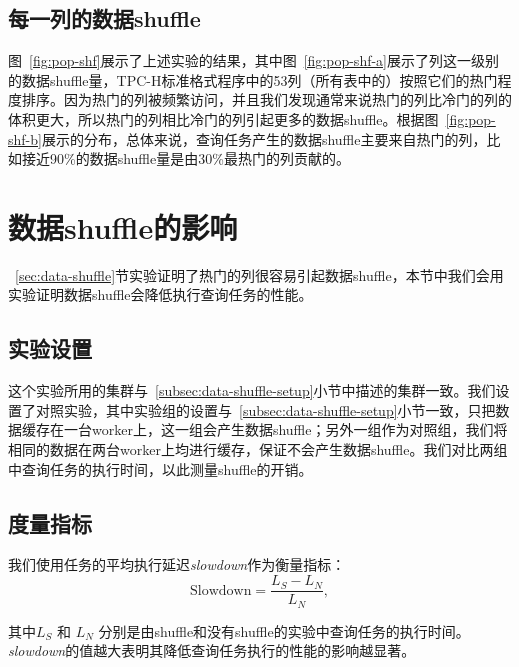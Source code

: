 \subsection{每一列的数据shuffle}

\par 图~\ref{fig:pop-shf}展示了上述实验的结果，其中图~\ref{fig:pop-shf-a}展示了列这一级别的数据shuffle量，TPC-H标准格式程序中的53列（所有表中的）按照它们的热门程度排序。因为热门的列被频繁访问，并且我们发现通常来说热门的列比冷门的列的体积更大，所以热门的列相比冷门的列引起更多的数据shuffle。根据图~\ref{fig:pop-shf-b}展示的分布，总体来说，查询任务产生的数据shuffle主要来自热门的列，比如接近90\%的数据shuffle量是由30\%最热门的列贡献的。

\section{数据shuffle的影响}
\label{sec:shuffle-impact}

\par ~\ref{sec:data-shuffle}节实验证明了热门的列很容易引起数据shuffle，本节中我们会用实验证明数据shuffle会降低执行查询任务的性能。

\subsection{实验设置}
\label{subsec:shuffle-impact-setup}

\par 这个实验所用的集群与~\ref{subsec:data-shuffle-setup}小节中描述的集群一致。我们设置了对照实验，其中实验组的设置与~\ref{subsec:data-shuffle-setup}小节一致，只把数据缓存在一台worker上，这一组会产生数据shuffle；另外一组作为对照组，我们将相同的数据在两台worker上均进行缓存，保证不会产生数据shuffle。我们对比两组中查询任务的执行时间，以此测量shuffle的开销。

\subsection{度量指标}
\label{subsec:shuffle-impact-metrics}

\par 我们使用任务的平均执行延迟\emph{slowdown}作为衡量指标：
\begin{equation}
    \text{Slowdown} = \frac{L_S - L_N}{L_N},
\end{equation}

\par 其中$L_S$ 和 $L_N$ 分别是由shuffle和没有shuffle的实验中查询任务的执行时间。\emph{slowdown}的值越大表明其降低查询任务执行的性能的影响越显著。

